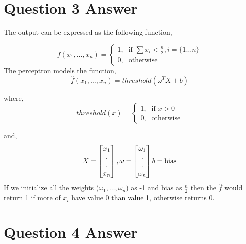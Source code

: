 \documentclass{article}
\begin{document}
\section*{Question 3 Answer}

The output can be expressed as the following function,

\begin{displaymath}
    f(x_1,\dots,x_n) = 
    \begin{cases} 
        \mbox{1,} & \mbox{if } \sum x_i < \frac{n}{2}, i = \{1\dots n\} \\ 
        \mbox{0,} & \mbox{otherwise} 
    \end{cases} 
\end{displaymath}
%
The perceptron models the function,
\begin{displaymath}
    \hat{f}(x_1,\dots,x_n) = threshold(\omega^T X + b)
\end{displaymath}

where,
\begin{displaymath}
    threshold(x) = 
    \begin{cases}
        \mbox{1,} & \mbox{if } x > 0 \\
        \mbox{0,} & \mbox{otherwise}
    \end{cases}
\end{displaymath}

and,
\begin{displaymath}
    X = \begin{bmatrix}x_1\\ . \\ . \\x_n\end{bmatrix},\\
    \omega = \begin{bmatrix}\omega_1\\ . \\ . \\\omega_n\end{bmatrix} \\
    b = \mbox{bias}
\end{displaymath}
%
If we initialize all the weights ($\omega_1,\dots,\omega_n$) as -1 and bias as $\frac{n}{2}$ then the $\hat{f}$ would return 1 if more of  $x_i$ have value 0 than value 1, otherwise returns 0.

\section*{Question 4 Answer}
\end{document}
